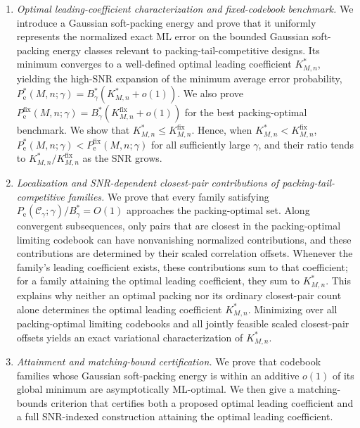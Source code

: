 \documentclass[12pt,draftclsnofoot,onecolumn]{IEEEtran}
\newcommand{\cC}{\mathcal{C}}
\newcommand{\Pe}{P_{\mathrm e}}
\theoremstyle{definition}
\begin{document}
\begin{enumerate}
\item \emph{Optimal leading-coefficient characterization and fixed-codebook benchmark.}
We introduce a Gaussian soft-packing energy and prove that it uniformly
represents the normalized exact ML error on the bounded Gaussian
soft-packing energy classes
relevant to packing-tail-competitive designs.  Its minimum converges to a
well-defined optimal leading coefficient \(K^{\ast}_{M,n}\), yielding the
high-SNR expansion of the minimum average error probability,
\(\Pe^{\ast}(M,n;\gamma)
  =B_\gamma^{\ast}(K^{\ast}_{M,n}+o(1))\).  We also prove
\(\Pe^{\mathrm{fix}}(M,n;\gamma)
  =B_\gamma^{\ast}(K^{\mathrm{fix}}_{M,n}+o(1))\) for the best
packing-optimal benchmark.  We show that
\(K^{\ast}_{M,n}\leq K^{\mathrm{fix}}_{M,n}\).  Hence, when
\(K^{\ast}_{M,n}<K^{\mathrm{fix}}_{M,n}\),
\(\Pe^{\ast}(M,n;\gamma)<\Pe^{\mathrm{fix}}(M,n;\gamma)\) for all
sufficiently large \(\gamma\), and their ratio tends to
\(K^{\ast}_{M,n}/K^{\mathrm{fix}}_{M,n}\) as the SNR grows.

\item \emph{Localization and SNR-dependent closest-pair contributions of
packing-tail-competitive families.}
We prove that every family satisfying
\(\Pe(\cC_\gamma;\gamma)/B_\gamma^{\ast}=O(1)\) approaches the
packing-optimal set.  Along convergent subsequences, only pairs that are
closest in the packing-optimal limiting codebook can have nonvanishing
normalized contributions, and these contributions are determined by their
scaled correlation offsets.  Whenever the family's leading coefficient
exists, these contributions sum to that coefficient; for a family attaining
the optimal leading coefficient, they sum to \(K^{\ast}_{M,n}\).  This
explains why neither an optimal packing nor its
ordinary closest-pair count alone determines the optimal leading
coefficient \(K^{\ast}_{M,n}\).  Minimizing over all packing-optimal limiting codebooks and
all jointly feasible scaled closest-pair offsets yields an exact
variational characterization of \(K^{\ast}_{M,n}\).

\item \emph{Attainment and matching-bound certification.}
We prove that codebook families whose Gaussian soft-packing energy is
within an additive \(o(1)\) of its global minimum are asymptotically
ML-optimal.  We then give a matching-bounds criterion that certifies both
a proposed optimal leading coefficient and a full SNR-indexed
construction attaining the optimal leading coefficient.


\end{enumerate}
\end{document}
